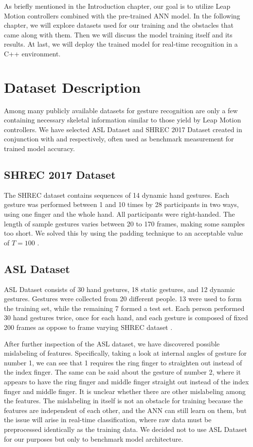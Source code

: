 
As briefly mentioned in the Introduction chapter, our goal is to utilize Leap Motion controllers combined with the pre-trained ANN model. In the following chapter, we will explore datasets used for our training and the obstacles that came along with them. Then we will discuss the model training itself and its results. At last, we will deploy the trained model for real-time recognition in a C++ environment.


\section{Dataset Description}

Among many publicly available datasets for gesture recognition are only a few containing necessary skeletal information similar to those yield by Leap Motion controllers. We have selected ASL Dataset and SHREC 2017 Dataset created in conjunction with \cite{avola} and \cite{shrec} respectively, often used as benchmark measurement for trained model accuracy.

\subsection{SHREC 2017 Dataset}

The SHREC dataset contains sequences of 14 dynamic hand gestures. Each gesture was performed between 1 and 10 times by 28 participants in two ways, using one finger and the whole hand. All participants were right-handed. The length of sample gestures varies between 20 to 170 frames, making some samples too short. We solved this by using the padding technique to an acceptable value of $T=100$ \cite{shrec}.

\subsection{ASL Dataset}

ASL Dataset consists of 30 hand gestures, 18 static gestures, and 12 dynamic gestures. Gestures were collected from 20 different people. 13 were used to form the training set, while the remaining 7 formed a test set. Each person performed 30 hand gestures twice, once for each hand, and each gesture is composed of fixed 200 frames as oppose to frame varying SHREC dataset \cite{avola}. 

After further inspection of the ASL dataset, we have discovered possible mislabeling of features. Specifically, taking a look at internal angles of gesture for number 1, we can see that 1 requires the ring finger to straighten out instead of the index finger. The same can be said about the gesture of number 2, where it appears to have the ring finger and middle finger straight out instead of the index finger and middle finger. It is unclear whether there are other mislabeling among the features. The mislabeling in itself is not an obstacle for training because the features are independent of each other, and the ANN can still learn on them, but the issue will arise in real-time classification, where raw data must be preprocessed identically as the training data. We decided not to use ASL Dataset for our purposes but only to benchmark model architecture.



